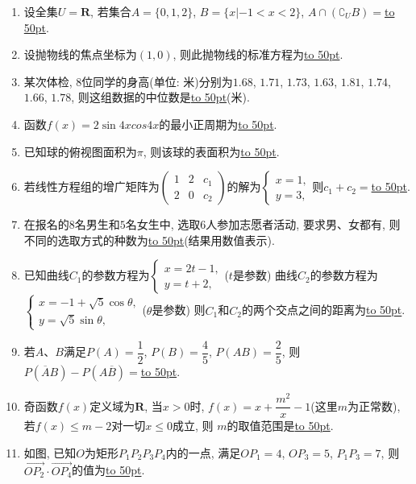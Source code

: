 \documentclass[10pt,a4paper]{article}
\newcommand{\blank}[1]{\underline{\hbox to #1pt{}}}
\begin{document}
\begin{enumerate}[1.]
\item 设全集$U=\mathbf{R}$, 若集合$A=\{0,1,2\}$, $B=\{x|-1<x<2\}$, $A\cap (\complement_UB)=$\blank{50}.
\item 设抛物线的焦点坐标为$(1,0)$, 则此抛物线的标准方程为\blank{50}.
\item 某次体检, $8$位同学的身高(单位: 米)分别为$1.68$, $1.71$, $1.73$, $1.63$, $1.81$, $1.74$, $1.66$, $1.78$, 则这组数据的中位数是\blank{50}(米).
\item 函数$f(x)=2\sin 4xcos4x$的最小正周期为\blank{50}.
\item 已知球的俯视图面积为$\pi$, 则该球的表面积为\blank{50}.
\item 若线性方程组的增广矩阵为$\begin{pmatrix}
1 & 2 & c_1  \\2 & 0 & c_2  \end{pmatrix}$的解为$\begin{cases} x=1, \\ y=3, \end{cases}$则$c_1+c_2=$\blank{50}.
\item 在报名的$8$名男生和$5$名女生中, 选取$6$人参加志愿者活动, 要求男、女都有, 则不同的选取方式的种数为\blank{50}(结果用数值表示).
\item 已知曲线$C_1$的参数方程为$\begin{cases}x=2t-1,  \\ y=t+2,  \end{cases}$($t$是参数) 曲线$C_2$的参数方程为$\begin{cases}
x=-1+\sqrt 5\cos \theta,   \\ y=\sqrt 5\sin \theta,   \end{cases}$($\theta$是参数) 则$C_1$和$C_2$的两个交点之间的距离为\blank{50}.
\item 若$A$、$B$满足$P(A)=\dfrac 12$, $P(B)=\dfrac 45$, $P(AB)=\dfrac 25$, 则$P(\overline{A}B)-P(A\overline{B})=$\blank{50}.
\item 奇函数$f(x)$定义域为$\mathbf{R}$, 当$x>0$时, $f(x)=x+\dfrac{m^2}x-1$(这里$m$为正常数), 若$f(x)\le m-2$对一切$x\le 0$成立, 则
$m$的取值范围是\blank{50}.
\item 如图, 已知$O$为矩形$P_1P_2P_3P_4$内的一点, 满足$OP_1=4$,
$OP_3=5$, $P_1P_3=7$, 则$\overrightarrow{OP_2}\cdot \overrightarrow{OP_4}$的值为\blank{50}.
\begin{center}
\end{center}
\end{enumerate}
\end{document}
